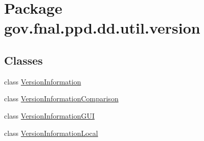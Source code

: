\hypertarget{namespacegov_1_1fnal_1_1ppd_1_1dd_1_1util_1_1version}{\section{Package gov.\-fnal.\-ppd.\-dd.\-util.\-version}
\label{namespacegov_1_1fnal_1_1ppd_1_1dd_1_1util_1_1version}
}
\subsection*{Classes}
\begin{DoxyCompactItemize}
\item 
class \hyperlink{classgov_1_1fnal_1_1ppd_1_1dd_1_1util_1_1version_1_1VersionInformation}{Version\-Information}
\item 
class \hyperlink{classgov_1_1fnal_1_1ppd_1_1dd_1_1util_1_1version_1_1VersionInformationComparison}{Version\-Information\-Comparison}
\item 
class \hyperlink{classgov_1_1fnal_1_1ppd_1_1dd_1_1util_1_1version_1_1VersionInformationGUI}{Version\-Information\-G\-U\-I}
\item 
class \hyperlink{classgov_1_1fnal_1_1ppd_1_1dd_1_1util_1_1version_1_1VersionInformationLocal}{Version\-Information\-Local}
\end{DoxyCompactItemize}
